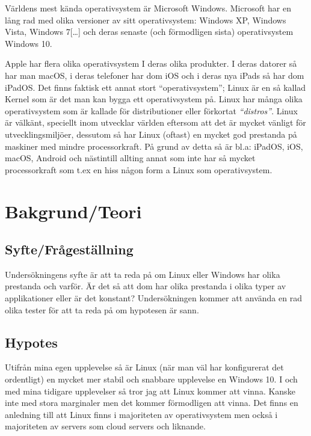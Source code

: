 \documentclass[12pt, a4paper]{report}
\begin{document}
   Världens mest kända operativsystem\cite{winstat} är Microsoft Windows. Microsoft har en lång rad med olika versioner av sitt operativsystem\cite{windows}: Windows XP, Windows Vista, Windows 7[\dots] och deras senaste (och förmodligen sista) operativsystem Windows 10.
    
   Apple har flera olika operativsystem\cite{appleOS} I deras olika produkter. I deras datorer så har man macOS, i deras telefoner har dom iOS och i deras nya iPads så har dom iPadOS.
    Det finns faktisk ett annat stort ``operativsystem''; Linux är en så kallad Kernel \cite{redhat} som är det man kan bygga ett operativsystem på. Linux har många olika operativsystem som är kallade för distributioner eller förkortat \textit{``distros''}. Linux är välkänt, speciellt inom utvecklar världen eftersom att det är mycket vänligt för utvecklingsmiljöer, dessutom så har Linux (oftast) en mycket god prestanda på maskiner med mindre processorkraft\cite{whatislinux}. På grund av detta så är bl.a: iPadOS, iOS, macOS, Android och nästintill allting annat som inte har så mycket processorkraft som t.ex en hiss någon form a Linux som operativsystem.
    
\section{Bakgrund/Teori}


    \subsection{Syfte/Frågeställning}
    Undersökningens syfte är att ta reda på om Linux eller Windows har olika prestanda och varför. Är det så att dom har olika prestanda i olika typer av applikationer eller är det konstant? Undersökningen kommer att använda en rad olika tester för att ta reda på om hypotesen är sann.
 

    \subsection{Hypotes}

    Utifrån mina egen upplevelse så är Linux (när man väl har konfigurerat det ordentligt) en mycket mer stabil och snabbare upplevelse en Windows 10. I och med mina tidigare upplevelser så tror jag att Linux kommer att vinna. Kanske inte med stora marginaler men det kommer förmodligen att vinna.
    Det finns en anledning till att Linux finns i majoriteten av operativsystem men också i majoriteten av servers som cloud servers och liknande.
 
\end{document}
